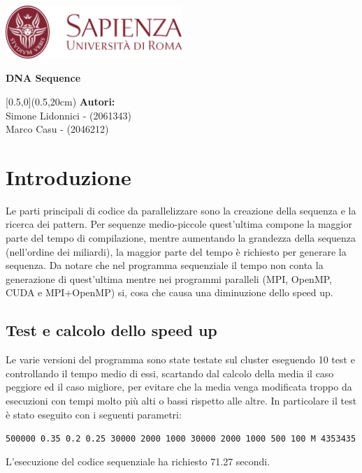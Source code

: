 \documentclass[12pt,openany]{report}
\date{\today}
\makeatletter
\def\tit{DNA Sequence}
\let\datename\@date
\def\authorname{Simone Lidonnici - (2061343)\\Marco Casu - (2046212)}
\makeatother
\begin{document}
\begin{titlepage}
    \begin{center}
        \includegraphics[width=0.5\textwidth]{images/Sapienza_logo.png}
    \end{center}
    \centering\Large \textbf{\color{Sapienza}{Facoltà di Ingegneria dell'Informazione, Informatica e Statistica\\Dipartimento di Informatica}}
    \vspace{4cm}
    \begin{tcolorbox}[enhanced, width=\textwidth, colframe=Sapienza, colback=white, halign=flush center, sharp corners=all, boxrule=1mm, bottom=5mm, top=5mm]
        \Huge\textbf{\tit}
    \end{tcolorbox}
    \begin{textblock*}{\textwidth}[0.5,0](0.5\pdfpagewidth,20cm)
        \centering\large\textbf{Autori:}\\\authorname
    \end{textblock*}
    \vfill
    \centering\large\datename
\end{titlepage}

\section{Introduzione}
Le parti principali di codice da parallelizzare sono la creazione della sequenza e la ricerca dei pattern. Per sequenze medio-piccole quest'ultima compone la maggior parte del tempo di compilazione, mentre aumentando la grandezza della sequenza (nell'ordine dei miliardi), la maggior parte del tempo è richiesto per generare la sequenza. Da notare che nel programma sequenziale il tempo non conta la generazione di quest'ultima mentre nei programmi paralleli (MPI, OpenMP, CUDA e MPI+OpenMP) si, cosa che causa una diminuzione dello speed up.
\subsection{Test e calcolo dello speed up}
Le varie versioni del programma sono state testate sul cluster eseguendo 10 test e controllando il tempo medio di essi, scartando dal calcolo della media il caso peggiore ed il caso migliore, per evitare che la media venga modificata troppo da esecuzioni con tempi molto più alti o bassi rispetto alle altre. In particolare il test è stato eseguito con i seguenti parametri:
\begin{center}
    \texttt{500000 0.35 0.2 0.25 30000 2000 1000 30000 2000 1000 500 100 M 4353435}
\end{center}
L'esecuzione del codice sequenziale ha richiesto 71.27 secondi.
\end{document}
